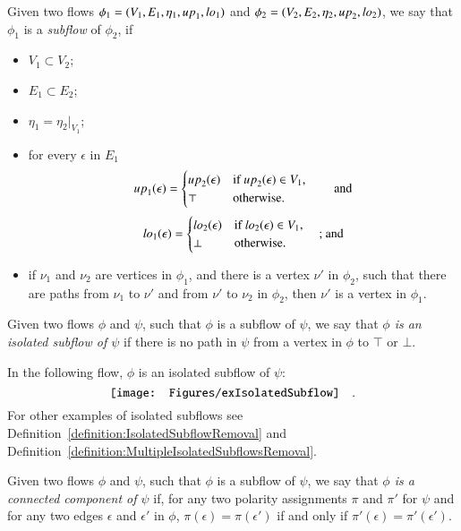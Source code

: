 \begin{definition}\label{definition:Subflow}
Given two flows $\phi_1=(V_1,E_1,\eta_1,{\mathit up}_1,{\mathit lo}_1)$ and $\phi_2=(V_2,E_2,\eta_2,{\mathit up}_2,{\mathit lo}_2)$, we say that $\phi_1$ is a \emph{subflow} of $\phi_2$, if
\begin{itemize}
\item $V_1\subset V_2$;
\item $E_1\subset E_2$;
\item $\eta_1=\eta_2|_{V_1}$;
\item for every $\epsilon$ in $E_1$
\[
{\mathit up}_1(\epsilon)=
\begin{cases}
{\mathit up}_2(\epsilon) & \mbox{if ${\mathit up}_2(\epsilon)\in V_1$,}
\\
\top & \mbox{otherwise.}
\end{cases}
\qquad\mbox{and}
\]
\[
{\mathit lo}_1(\epsilon)=
\begin{cases}
{\mathit lo}_2(\epsilon) & \mbox{if ${\mathit lo}_2(\epsilon)\in V_1$,}
\\
\bot & \mbox{otherwise.}
\end{cases}\quad\mbox{; and}
\]
\item
if $\nu_1$ and $\nu_2$ are vertices in $\phi_1$, and there is a vertex $\nu'$ in $\phi_2$, such that there are paths from $\nu_1$ to $\nu'$ and from $\nu'$ to $\nu_2$ in $\phi_2$, then $\nu'$ is a vertex in $\phi_1$.
\end{itemize}
\end{definition}


\begin{definition}\label{defintion:IsolatedSubflow}
Given two flows $\phi$ and $\psi$, such that $\phi$ is a subflow of $\psi$, we say that \emph{$\phi$ is an isolated subflow of $\psi$} if there is no path in $\psi$ from a vertex in $\phi$ to $\top$ or $\bot$.
\end{definition}

\begin{example}
In the following flow, $\phi$ is an isolated subflow of $\psi$:
\[
\vcenter{\hbox{\texttt{[image: Figures/exIsolatedSubflow]}}}
\quad.
\]
For other examples of isolated subflows see Definition~\vref{definition:IsolatedSubflowRemoval} and Definition~\vref{definition:MultipleIsolatedSubflowsRemoval}.
\end{example}

\begin{definition}\label{definition:ConnectedComponent}
Given two flows $\phi$ and $\psi$, such that $\phi$ is a subflow of $\psi$, we say that \emph{$\phi$ is a connected component of $\psi$} if, for any two polarity assignments $\pi$ and $\pi'$ for $\psi$ and for any two edges $\epsilon$ and $\epsilon'$ in $\phi$, $\pi(\epsilon)=\pi(\epsilon')$ if and only if $\pi'(\epsilon)=\pi'(\epsilon')$.
\end{definition}
